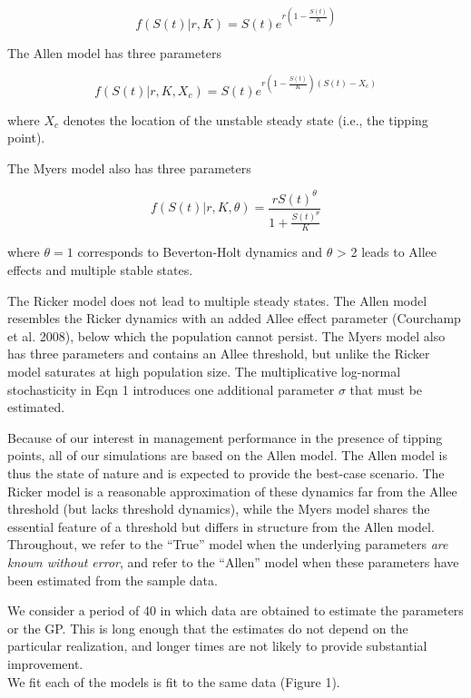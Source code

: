 \documentclass[author-year, 12pt,review]{components/elsarticle} %
\begin{document}
\begin{equation}
f(S(t)|r,K) = S(t) e^{r \left(1 - \frac{S(t)}{K} \right) } \label{ricker}
\end{equation}

The Allen model has three parameters

\begin{equation}
f(S(t)|r, K, X_c) = S(t) e^{r \left(1 - \frac{S(t)}{K}\right)\left(S(t) - X_c\right)} \label{allen}
\end{equation}

where $X_c$ denotes the location of the unstable steady state (i.e., the
tipping point).

The Myers model also has three parameters

\begin{equation}
f(S(t) | r, K, \theta)  = \frac{r S(t)^{\theta}}{1 + \frac{S(t)^\theta}{K}} \label{myers}
\end{equation}

where $\theta = 1$ corresponds to Beverton-Holt dynamics and $\theta$
\textgreater{} 2 leads to Allee effects and multiple stable states.

The Ricker model does not lead to multiple steady states. The Allen
model resembles the Ricker dynamics with an added Allee effect parameter
(Courchamp et al. 2008), below which the population cannot persist. The
Myers model also has three parameters and contains an Allee threshold,
but unlike the Ricker model saturates at high population size. The
multiplicative log-normal stochasticity in Eqn 1 introduces one
additional parameter $\sigma$ that must be estimated.

Because of our interest in management performance in the presence of
tipping points, all of our simulations are based on the Allen model. The
Allen model is thus the state of nature and is expected to provide the
best-case scenario. The Ricker model is a reasonable approximation of
these dynamics far from the Allee threshold (but lacks threshold
dynamics), while the Myers model shares the essential feature of a
threshold but differs in structure from the Allen model. Throughout, we
refer to the ``True'' model when the underlying parameters \emph{are
known without error}, and refer to the ``Allen'' model when these
parameters have been estimated from the sample data.

We consider a period of 40 in which data are obtained to estimate the
parameters or the GP. This is long enough that the estimates do not
depend on the particular realization, and longer times are not likely to
provide substantial improvement.\\We fit each of the models is fit to
the same data (Figure 1).
\end{document}
